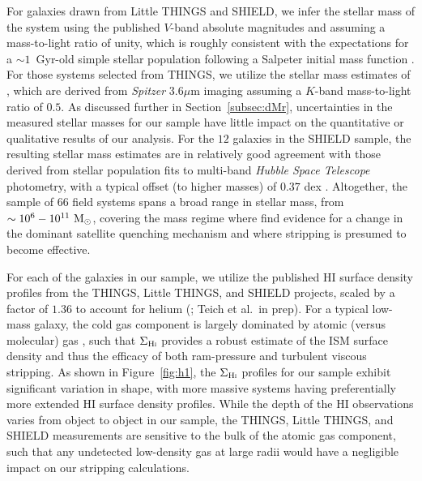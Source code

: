 \documentclass[usenatbib]{mn2e}
\newcommand{\msun}{{\rm M}_{\odot}}
\begin{document}
For galaxies drawn from Little THINGS and SHIELD, we infer the stellar
mass of the system using the published $V$-band absolute magnitudes
\citep{hunter12, hauerberg15} and assuming a mass-to-light ratio of
unity, which is roughly consistent with the expectations for a
$\sim1$~Gyr-old simple stellar population following a Salpeter initial
mass function \citep[e.g.][]{maraston98}.
%
For those systems selected from THINGS, we utilize the stellar mass
estimates of \citet{leroy08}, which are derived from {\it Spitzer}
3.6$\mu$m imaging assuming a $K$-band mass-to-light ratio of $0.5$.
%
As discussed further in Section~\ref{subsec:dMr}, uncertainties in the
measured stellar masses for our sample have little impact on the
quantitative or qualitative results of our analysis.
%
For the $12$ galaxies in the SHIELD sample, the resulting stellar mass
estimates are in relatively good agreement with those derived from
stellar population fits to multi-band {\it Hubble Space Telescope}
photometry, with a typical offset (to higher masses) of $0.37$ dex
\citep{mcquinn15}.
%
Altogether, the sample of $66$ field systems spans a broad range in
stellar mass, from $\sim10^{6}-10^{11}~\msun$, covering the mass
regime where \citet{fham15} find evidence for a change in the dominant
satellite quenching mechanism and where stripping is presumed to
become effective.
%

For each of the galaxies in our sample, we utilize the published
H{\scriptsize I} surface density profiles from the THINGS, Little
THINGS, and SHIELD projects, scaled by a factor of $1.36$ to account
for helium (\citealt{leroy08, hunter12, teich15}; Teich et al.~in
prep).
%
For a typical low-mass galaxy, the cold gas component is largely
dominated by atomic (versus molecular) gas \citep[e.g.][]{popping14,
  boselli14}, such that $\Sigma_{\rm H\scalebox{0.45}{\rm I}}$
provides a robust estimate of the ISM surface density and thus the
efficacy of both ram-pressure and turbulent viscous stripping.
%
As shown in Figure~\ref{fig:h1}, the $\Sigma_{\rm H\scalebox{0.45}{\rm
    I}}$ profiles for our sample exhibit significant variation in
shape, with more massive systems having preferentially more extended
H{\scriptsize I} surface density profiles.
%
While the depth of the H{\scriptsize I} observations varies from
object to object in our sample, the THINGS, Little THINGS, and SHIELD
measurements are sensitive to the bulk of the atomic gas component,
such that any undetected low-density gas at large radii would have a
negligible impact on our stripping calculations. 
%
\end{document}

